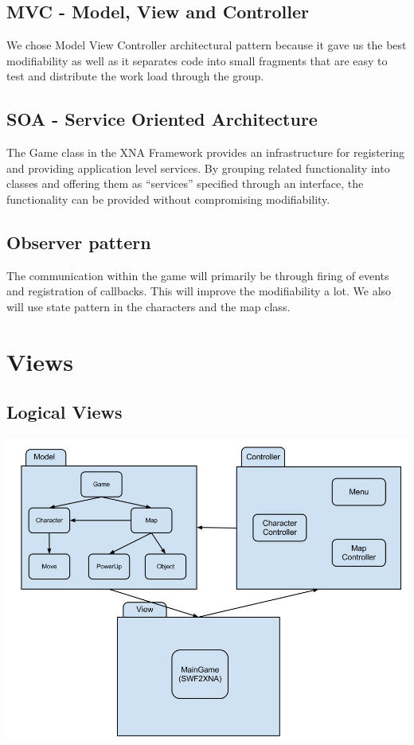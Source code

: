 \section{MVC - Model, View and Controller}
We chose Model View Controller architectural pattern because it gave us the best modifiability  as well as it separates code into small fragments that are easy to test and distribute the work load through the group.

\section{SOA - Service Oriented Architecture}
The Game class in the XNA Framework provides an infrastructure for registering and providing application level services. By grouping related functionality into classes and offering them as “services” specified through an interface, the functionality can be provided without compromising modifiability.

\section{Observer pattern}
The communication within the game will primarily be through firing of events and registration of callbacks. This will improve the modifiability a lot. We also will use state pattern in the characters and the map class.

\chapter{Views}
\section{Logical Views}
\includegraphics[scale=0.45]{logical.jpg}

